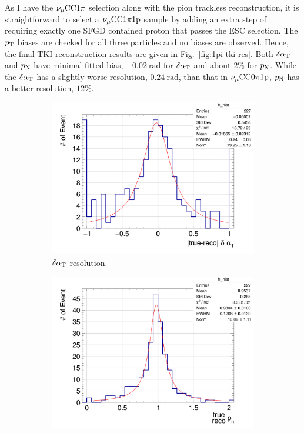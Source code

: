     As I have the $\nu_{\mu}\textrm{CC}1\pi$ selection along with the pion trackless reconstruction, it is straightforward to select a $\nu_{\mu}\textrm{CC}1\pi1\textrm{p}$ sample by adding an extra step of requiring exactly one SFGD contained proton that passes the ESC selection. 
    The $p_\textrm{T}$ biases are checked for all three particles and no biases are observed. Hence, the final TKI reconstruction results are given in Fig.~\ref{fig:1pi-tki-res}. Both $\delta\alpha_\textrm{T}$ and $p_\textrm{N}$ have minimal fitted bias, $-0.02~\textrm{rad}$ for $\delta\alpha_\textrm{T}$ and about $2\%$ for $p_\textrm{N}$. While the $\delta\alpha_\textrm{T}$ has a slightly worse resolution, $0.24~\textrm{rad}$, than that in $\nu_{\mu}\textrm{CC}0\pi1\textrm{p}$, $p_\textrm{N}$ has a better resolution, $12\%$. 
    
   \begin{figure}[!htb] 
       \centering
       \begin{subfigure}{0.45\textwidth}
            \includegraphics[width=\textwidth]{figures/SFGpTPCmu_dalphat_rat_hist_al14.png}
            \caption{$\delta\alpha_\textrm{T}$ resolution.}
            \label{fig:1pi-dat-res}
       \end{subfigure}
       \begin{subfigure}{0.45\textwidth}
            \includegraphics[width=\textwidth]{figures/SFGpTPCmu_pn_rat_hist_al14.png}

\end{subfigure}
\end{figure}
